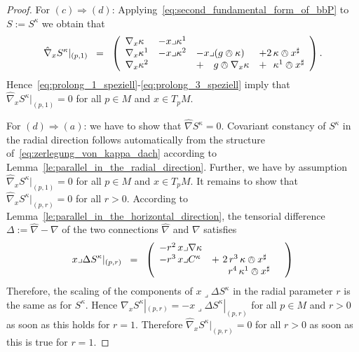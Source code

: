 \documentclass[11pt,a4paper]{article}
\theoremstyle{plain}
\theoremstyle{remark}
\begin{document}
\begin{proof}
For $(c)\Rightarrow (d)$: Applying~\eqref{eq:second_fundamental_form_of_bbP}
to  $S := S^\kappa$ we obtain that
\begin{equation}\label{eq:second_fundamental_form_of_bbP_im_spezialfall}
\hat\nabla_xS^\kappa|_{(p,1)}\;\;=\;\;\left ( \begin{array}{llll}
\nabla_x\kappa & - x\lrcorner \kappa^1& &\\
\nabla_x \kappa^1  & - x\lrcorner \kappa^2  & - x\lrcorner (g\owedge \kappa) & + 2\, \kappa\owedge x^\sharp\\
\nabla_{x}\kappa^2 & & + \ \ \ g\owedge \nabla_x\kappa & +\ \ \kappa^1\owedge x^\sharp 
\end{array} \right ).
 \end{equation}
Hence~\eqref{eq:prolong_1_speziell}-\eqref{eq:prolong_3_speziell} imply that $\hat\nabla_xS^\kappa|_{(p,1)} = 0$ for all $p\in M$ and $x\in T_pM$.


For $(d)\Rightarrow (a)$: we have to show that $\hat\nabla S^\kappa =0 $. Covariant constancy of $S^\kappa$ 
in the radial direction follows automatically from the structure of~\eqref{eq:zerlegung_von_kappa_dach} according to Lemma~\ref{le:parallel_in_the_radial_direction}.
Further, we have by assumption $\hat\nabla_x S^\kappa|_{(p,1)} = 0$ for all $p\in M$ and $x\in T_pM$. It remains to show that $\hat\nabla_x S^\kappa|_{(p,r)} = 0$ for all $r>0$. 
According to Lemma~\ref{le:parallel_in_the_horizontal_direction}, the tensorial difference $\Delta := \hat\nabla - \nabla$ of the two connections $\hat\nabla$ and $\nabla$  satisfies 
\begin{equation*}
x\lrcorner \Delta S^\kappa|_{(p,r)} \;\;=\;\;\left (  \begin{array}{lll}
 - r^2\, x\lrcorner \nabla\kappa& & \\
 - r^3\, x\lrcorner C^\kappa  & + \ 2\, r^3\, \kappa  \owedge x^\sharp&\\
&\quad \ \  r^4\, \kappa^1\owedge x^\sharp   &
\end{array} \right )
\end{equation*} 
Therefore, the scaling of the components of $x\lrcorner \Delta S^\kappa$ in the radial parameter $r$ is the same as for $S^\kappa$. Hence 
$\nabla_xS^\kappa|_{(p,r)} = - x\lrcorner \Delta S^\kappa|_{(p,r)}$ for all $p\in M$ and $r>0$ as soon as this holds for $r = 1$. Therefore $\hat\nabla_x S^\kappa|_{(p,r)} = 0$ for all $r>0$ as soon as this is true for $r=1$.
\end{proof}
\end{document}
